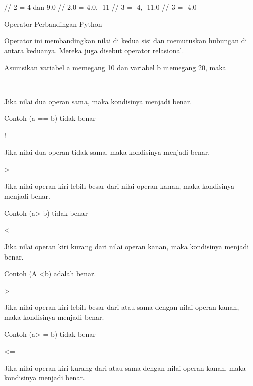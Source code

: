\vspace{12pt}
 // 2 = 4 dan 9.0 // 2.0 = 4.0, -11 // 3 = -4, -11.0 // 3 = -4.0 \par
\vspace{12pt}
\noindent 
Operator Perbandingan Python \par
\vspace{12pt}
\noindent 
Operator ini membandingkan nilai di kedua sisi dan memutuskan hubungan di antara keduanya. $  $Mereka juga disebut operator relasional. \par
\vspace{12pt}
\noindent 
Asumsikan variabel a memegang 10 dan variabel b memegang 20, maka  \par
\vspace{12pt}
\noindent 
== \par
\noindent 
Jika nilai dua operan sama, maka kondisinya menjadi benar. \par
\noindent 
Contoh (a == b) tidak benar \par
\vspace{12pt}
\noindent 
! = \par
\noindent 
Jika nilai dua operan tidak sama, maka kondisinya menjadi benar. \par
\vspace{12pt}
\noindent 
> \par
\noindent 
Jika nilai operan kiri lebih besar dari nilai operan kanan, maka kondisinya menjadi benar. \par
\noindent 
Contoh (a> b) tidak benar \par
\vspace{12pt}
\noindent 
< \par
\noindent 
Jika nilai operan kiri kurang dari nilai operan kanan, maka kondisinya menjadi benar. \par
\noindent 
Contoh (A <b) adalah benar. \par
\vspace{12pt}
\noindent 
> = \par
\noindent 
Jika nilai operan kiri lebih besar dari atau sama dengan nilai operan kanan, maka kondisinya menjadi benar. \par
\noindent 
Contoh (a> = b) tidak benar \par
\vspace{12pt}
\noindent 
<= \par
\noindent 
Jika nilai operan kiri kurang dari atau sama dengan nilai operan kanan, maka kondisinya menjadi benar. \par
\noindent 
